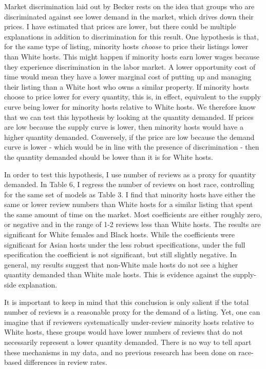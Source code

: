\documentclass[11pt, oneside]{article}
\begin{document}
Market discrimination laid out by Becker rests on the idea that groups who are discriminated against see lower demand in the market, which drives down their prices. I have estimated that prices are lower, but there could be multiple explanations in addition to discrimination for this result. One hypothesis is that, for the same type of listing, minority hosts \textit{choose} to price their listings lower than White hosts. This might happen if minority hosts earn lower wages because they experience discrimination in the labor market. A lower opportunity cost of time would mean they have a lower marginal cost of putting up and managing their listing than a White host who owns a similar property. If minority hosts choose to price lower for every quantity, this is, in effect, equivalent to the supply curve being lower for minority hosts relative to White hosts. We therefore know that we can test this hypothesis by looking at the quantity demanded. If prices are low because the supply curve is lower, then minority hosts would have a higher quantity demanded. Conversely, if the price are low because the demand curve is lower - which would be in line with the presence of discrimination - then the quantity demanded should be lower than it is for White hosts. 

In order to test this hypothesis, I use number of reviews as a proxy for quantity demanded. In Table 6, I regress the number of reviews on host race, controlling for the same set of models as Table 3. I find that minority hosts have either the same or lower review numbers than White hosts for a similar listing that spent the same amount of time on the market. Most coefficients are either roughly zero, or negative and in the range of 1-2 reviews less than White hosts. The results are significant for White females and Black hosts. While the coefficients were significant for Asian hosts under the less robust specifications, under the full specification the coefficient is not significant, but still slightly negative. In general, my results suggest that non-White male hosts do not see a higher quantity demanded than White male hosts. This is evidence against the supply-side explanation. 

It is important to keep in mind that this conclusion is only salient if the total number of reviews is a reasonable proxy for the demand of a listing. Yet, one can imagine that if reviewers systematically under-review minority hosts relative to White hosts, these groups would have lower numbers of reviews that do not necessarily represent a lower quantity demanded. There is no way to tell apart these mechanisms in my data, and no previous research has been done on race-based differences in review rates. 
\end{document}
